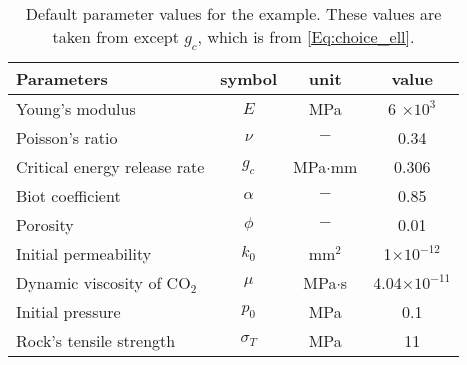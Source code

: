 
\begin{table}[htbp]
    \centering
    \caption{Default parameter values for the example. These values are taken from \cite{wang2018influence} except $g_c$, which is from \eqref{Eq:choice_ell}.}

    \begin{tabular}{l c c c}
    \hline 
         Parameters & symbol & unit& value \\
    \hline 
         Young's modulus & $E$ &MPa&  6 $\times 10^{3}$\\
         Poisson's ratio & $\nu$ &$-$&  0.34\\
         Critical energy release rate & $g_c$ &MPa$\cdot$mm&  0.306\\
         Biot coefficient & $\alpha$ &$-$&  0.85\\
         Porosity & $\phi$ &$-$&  0.01\\
         Initial permeability & $k_0$ &mm$^2$&  1$\times 10^{-12}$\\
         Dynamic viscosity of  {CO}$_2$ & $\mu$ & MPa$\cdot$s& 4.04$\times 10^{-11}$\\
         Initial pressure & $p_0$ &MPa&  0.1\\
         Rock's tensile strength & $\sigma_T$ &MPa&  11\\

    \hline     
    \end{tabular}
    \label{Tab:Gas_input}
\end{table}

